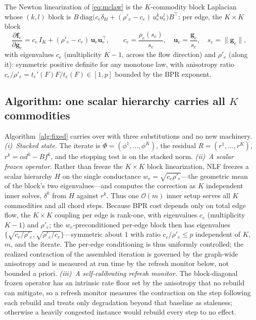 \documentclass{siamart220329}
\newcommand{\Om}{\mathcal{O}(m)}
\begin{document}
The Newton linearization of \eqref{eq:mclaw} is the $K$-commodity block Laplacian whose $(k,l)$
block is $B\,\mathrm{diag}\big(c_e\delta_{kl}+(\rho'_e-c_e)\,u^k_eu^l_e\big)B^{\top}$: per edge, the
$K\times K$ block
\begin{equation}\label{eq:mcjac}
\frac{\partial\mathbf f_e}{\partial\mathbf g_e}
= c_e\,I_K+(\rho'_e-c_e)\,\mathbf u_e\mathbf u_e^{\top},\qquad
c_e=\frac{\rho_e(s_e)}{s_e},\quad \mathbf u_e=\frac{\mathbf g_e}{s_e},\quad s_e=\|\mathbf g_e\| ,
\end{equation}
with eigenvalues $c_e$ (multiplicity $K-1$, across the flow direction) and $\rho'_e$ (along it):
symmetric positive definite for any monotone law, with anisotropy ratio
$c_e/\rho'_e=t_e'(F)F/t_e(F)\in[1,p]$ bounded by the BPR exponent.

\subsection{Algorithm: one scalar hierarchy carries all $K$ commodities}\label{sec:mcalg}
Algorithm~\ref{alg:fixed} carries over with three substitutions and no new machinery.
\emph{(i)~Stacked state.} The iterate is $\Phi=(\phi^1,\dots,\phi^K)$, the residual
$R=(r^1,\dots,r^K)$, $r^k=\alpha d^k-Bf^k$, and the stopping test is on the stacked norm.
\emph{(ii)~A scalar frozen operator.} Rather than freeze the $K\times K$ block linearization, NLF
freezes a scalar hierarchy $H$ on the single conductance
$w_e=\sqrt{c_e\rho'_e}$---the geometric mean of the block's two eigenvalues---and computes the
correction as $K$ independent inner solves, $\delta^k$ from $H$ against $r^k$. Thus one $\Om$ inner setup
serves all $K$ commodities and all chord steps.
Because BPR cost depends only on total edge flow, the $K\times K$ coupling per edge is rank-one, with
eigenvalues $c_e$ (multiplicity $K-1$) and $\rho'_e$; the $w_e$-preconditioned per-edge block then has
eigenvalues $\{\sqrt{c_e/\rho'_e},\sqrt{\rho'_e/c_e}\}$---symmetric about $1$ with ratio
$c_e/\rho'_e\le p$ independent of $K$, $m$, and the iterate. The per-edge conditioning is thus
uniformly controlled; the realized contraction of the assembled
iteration is governed by the graph-wide anisotropy and is measured at run time by the refresh monitor
below, not bounded a priori. \emph{(iii)~A self-calibrating refresh monitor.} The block-diagonal
frozen operator has an intrinsic rate floor set by the anisotropy that no rebuild can mitigate, so
a refresh monitor measures the contraction on the step following each rebuild and treats only
degradation beyond that baseline as staleness; otherwise a heavily congested instance would
rebuild every step to no effect.
\end{document}
